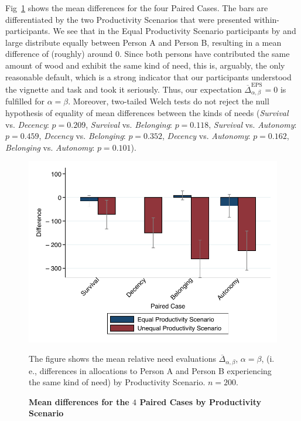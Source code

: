 \documentclass[10pt,letterpaper]{article}
\begin{document}
Fig~\ref{fig:overview_paired} shows the mean differences for the four Paired Cases.
The bars are differentiated by the two Productivity Scenarios that were presented within-participants.
We see that in the Equal Productivity Scenario participants by and large distribute equally between Person A and Person B, resulting in a mean difference of (roughly) around $0$.
Since both persons have contributed the same amount of wood and exhibit the same kind of need, this is, arguably, the only reasonable default, which is a strong indicator that our participants understood the vignette and task and took it seriously.
Thus, our expectation $\overline{\Delta}^\text{EPS}_{\alpha,\beta}=0$ is fulfilled for $\alpha=\beta$.
Moreover, two-tailed Welch tests do not reject the null hypothesis of equality of mean differences between the kinds of needs (\textit{Survival} vs. \textit{Decency}: $p=0.209$, \textit{Survival} vs. \textit{Belonging}: $p=0.118$, \textit{Survival} vs. \textit{Autonomy}: $p=0.459$, \textit{Decency} vs. \textit{Belonging}: $p=0.352$, \textit{Decency} vs. \textit{Autonomy}: $p=0.162$, \textit{Belonging} vs. \textit{Autonomy}: $p=0.101$).

\begin{figure}[t]
   \includegraphics[width=\textwidth]{figures/figure_4.pdf}
   \caption{\bf Mean differences for the $4$ Paired Cases by Productivity Scenario}
   The figure shows the mean relative need evaluations $\overline{\Delta}_{\alpha,\beta}$, $\alpha=\beta$, (i.\,e., differences in allocations to Person A and Person B experiencing the same kind of need)  by Productivity Scenario. $n=200$.
   \label{fig:overview_paired}
\end{figure}
\end{document}
